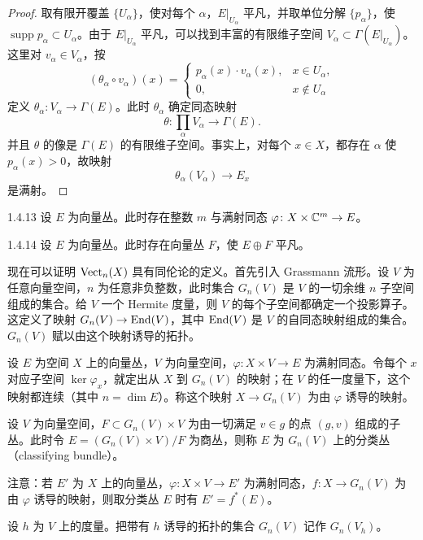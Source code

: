 \begin{proof}
  取有限开覆盖 $\{U_\alpha\}$，使对每个 $\alpha$，$E|_{U_\alpha}$ 平凡，并取单位分解 $\{p_\alpha\}$，使 $\operatorname{supp}p_\alpha\subset U_\alpha$。由于 $E|_{U_\alpha}$ 平凡，可以找到丰富的有限维子空间 $V_\alpha\subset\Gamma(E|_{U_\alpha})$。这里对 $v_\alpha\in V_\alpha$，按
\[
(\theta_\alpha\circ v_\alpha)(x)=\begin{cases}p_\alpha(x)\cdot v_\alpha(x), & x\in U_\alpha,\\ 0, & x\notin U_\alpha\end{cases}
\]
定义 $\theta_\alpha\colon V_\alpha\to\Gamma(E)$。此时 $\theta_\alpha$ 确定同态映射
\[
\theta\colon\prod_\alpha V_\alpha\longrightarrow\Gamma(E).
\]
并且 $\theta$ 的像是 $\Gamma(E)$ 的有限维子空间。事实上，对每个 $x\in X$，都存在 $\alpha$ 使 $p_\alpha(x)>0$，故映射
\[
\theta_\alpha(V_\alpha)\longrightarrow E_x
\]
是满射。
\end{proof}

\begin{corollary}{1.4.13}
  设 $E$ 为向量丛。此时存在整数 $m$ 与满射同态 $\varphi\colon X\times\mathbb{C}^m\to E$。
\end{corollary}

\begin{corollary}{1.4.14}
  设 $E$ 为向量丛。此时存在向量丛 $F$，使 $E\oplus F$ 平凡。
\end{corollary}

现在可以证明 $\operatorname{Vect}_n(X)$ 具有同伦论的定义。首先引入 Grassmann 流形。设 $V$ 为任意向量空间，$n$ 为任意非负整数，此时集合 $G_n(V)$ 是 $V$ 的一切余维 $n$ 子空间组成的集合。给 $V$ 一个 Hermite 度量，则 $V$ 的每个子空间都确定一个投影算子。这定义了映射 $G_n(V)\to\operatorname{End}(V)$，其中 $\operatorname{End}(V)$ 是 $V$ 的自同态映射组成的集合。$G_n(V)$ 赋以由这个映射诱导的拓扑。

设 $E$ 为空间 $X$ 上的向量丛，$V$ 为向量空间，$\varphi\colon X\times V\to E$ 为满射同态。令每个 $x$ 对应子空间 $\ker\varphi_x$，就定出从 $X$ 到 $G_n(V)$ 的映射；在 $V$ 的任一度量下，这个映射都连续（其中 $n=\dim E$）。称这个映射 $X\to G_n(V)$ 为由 $\varphi$ 诱导的映射。


设 $V$ 为向量空间，$F\subset G_n(V)\times V$ 为由一切满足 $v\in g$ 的点 $(g,v)$ 组成的子丛。此时令 $E=(G_n(V)\times V)/F$ 为商丛，则称 $E$ 为 $G_n(V)$ 上的分类丛（classifying bundle）。

注意：若 $E'$ 为 $X$ 上的向量丛，$\varphi\colon X\times V\to E'$ 为满射同态，$f\colon X\to G_n(V)$ 为由 $\varphi$ 诱导的映射，则取分类丛 $E$ 时有 $E'=f^*(E)$。

设 $h$ 为 $V$ 上的度量。把带有 $h$ 诱导的拓扑的集合 $G_n(V)$ 记作 $G_n(V_h)$。


